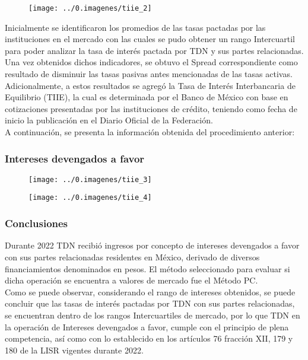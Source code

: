 \begin{figure}[H]
\centering
\texttt{[image: ../0.imagenes/tiie\_2]}
\end{figure}

Inicialmente se identificaron los promedios de las tasas pactadas por las instituciones en el mercado con las cuales se pudo obtener un rango Intercuartil para poder analizar la tasa de interés pactada por TDN y sus partes relacionadas.\\

Una vez obtenidos dichos indicadores, se obtuvo el Spread correspondiente como resultado de disminuir las tasas pasivas antes mencionadas de las tasas activas. \\

Adicionalmente, a estos resultados se agregó la Tasa de Interés Interbancaria de Equilibrio (TIIE), la cual es determinada por el Banco de México con base en cotizaciones presentadas por las instituciones de crédito, teniendo como fecha de inicio la publicación en el Diario Oficial de la Federación. \\

A continuación, se presenta la información obtenida del procedimiento anterior:\\

\subsubsection{Intereses devengados a favor}

\begin{figure}[H]
\centering
\texttt{[image: ../0.imagenes/tiie\_3]}
\end{figure}

\begin{figure}[H]
\centering
\texttt{[image: ../0.imagenes/tiie\_4]}
\end{figure}

\subsubsection{Conclusiones}

Durante 2022 TDN recibió ingresos por concepto de intereses devengados a favor con sus partes relacionadas residentes en México, derivado de diversos financiamientos denominados en pesos. El método seleccionado para evaluar si dicha operación se encuentra a valores de mercado fue el Método PC.\\

Como se puede observar, considerando el rango de intereses obtenidos, se puede concluir que las tasas de interés pactadas por TDN con sus partes relacionadas, se encuentran dentro de los rangos Intercuartiles de mercado, por lo que TDN en la operación de Intereses devengados a favor, cumple con el principio de plena competencia, así como con lo establecido en los artículos 76 fracción XII, 179 y 180 de la LISR vigentes durante 2022.
